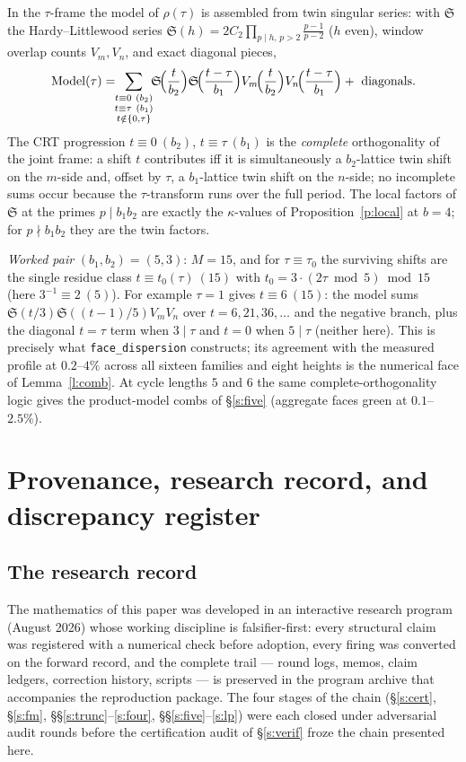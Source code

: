 \documentclass[11pt]{article}
\numberwithin{equation}{section}
\theoremstyle{definition}
\theoremstyle{remark}
\newcommand{\SSS}{\mathfrak{S}}
\begin{document}
In the $\tau$-frame the model of $\rho(\tau)$ is assembled from
twin singular series: with $\SSS$ the Hardy--Littlewood series
$\SSS(h)=2C_2\prod_{p\mid h,\,p>2}\frac{p-1}{p-2}$ ($h$ even),
window overlap counts $V_m,V_n$, and exact diagonal pieces,
\[
\mathrm{Model}(\tau)=\!\!\sum_{\substack{t\equiv0\ (b_2)\\
t\equiv\tau\ (b_1)\\ t\notin\{0,\tau\}}}\!\!
\SSS\!\Bigl(\frac{t}{b_2}\Bigr)\SSS\!\Bigl(\frac{t-\tau}{b_1}\Bigr)
V_m\!\Bigl(\frac{t}{b_2}\Bigr)V_n\!\Bigl(\frac{t-\tau}{b_1}\Bigr)
+\ \text{diagonals}.
\]
The CRT progression $t\equiv0\ (b_2)$, $t\equiv\tau\ (b_1)$ is
the \emph{complete} orthogonality of the joint frame: a shift $t$
contributes iff it is simultaneously a $b_2$-lattice twin shift
on the $m$-side and, offset by $\tau$, a $b_1$-lattice twin shift
on the $n$-side; no incomplete sums occur because the
$\tau$-transform runs over the full period. The local factors of
$\SSS$ at the primes $p\mid b_1b_2$ are exactly the
$\kappa$-values of Proposition~\ref{p:local} at $b=4$; for
$p\nmid b_1b_2$ they are the twin factors.

\emph{Worked pair} $(b_1,b_2)=(5,3)$: $M=15$, and for
$\tau\equiv\tau_0$ the surviving shifts are the single residue
class $t\equiv t_0(\tau)\ (15)$ with
$t_0=3\cdot(2\tau\bmod5)\bmod15$ (here $3^{-1}\equiv2\ (5)$). For
example $\tau=1$ gives $t\equiv6\ (15)$: the model sums
$\SSS(t/3)\SSS((t-1)/5)V_mV_n$ over $t=6,21,36,\dots$ and the
negative branch, plus the diagonal $t=\tau$ term when $3\mid\tau$
and $t=0$ when $5\mid\tau$ (neither here). This is precisely what
\texttt{face\_dispersion} constructs; its agreement with the
measured profile at $0.2$--$4\%$ across all sixteen families and
eight heights is the numerical face of Lemma~\ref{l:comb}. At
cycle lengths $5$ and $6$ the same complete-orthogonality logic
gives the product-model combs of \S\ref{s:five} (aggregate faces
green at $0.1$--$2.5\%$).

\section{Provenance, research record, and discrepancy
register}\label{a:record}

\subsection*{The research record}

The mathematics of this paper was developed in an interactive
research program (August 2026) whose working discipline is
falsifier-first: every structural claim was registered with a
numerical check before adoption, every firing was converted on
the forward record, and the complete trail --- round logs,
memos, claim ledgers, correction history, scripts --- is
preserved in the program archive that accompanies the
reproduction package. The four stages of the chain
(\S\ref{s:cert}, \S\ref{s:fm},
\S\S\ref{s:trunc}--\ref{s:four},
\S\S\ref{s:five}--\ref{s:lp}) were each closed under
adversarial audit rounds before the certification audit of
\S\ref{s:verif} froze the chain presented here.
\end{document}

